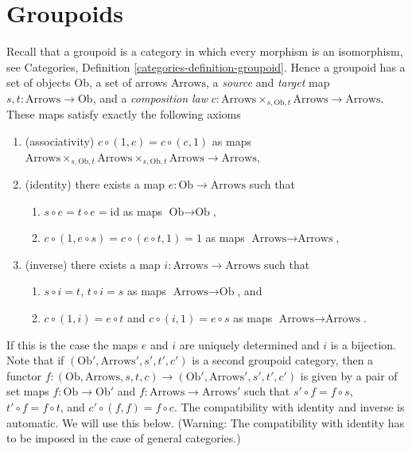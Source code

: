 \section{Groupoids}
\label{groupoids-section-groupoids}
Recall that a groupoid is a category in which every morphism
is an isomorphism, see
Categories, Definition \ref{categories-definition-groupoid}.
Hence a groupoid has a set of objects $\text{Ob}$,
a set of arrows $\text{Arrows}$, a {\it source} and {\it target}
map $s, t : \text{Arrows} \to \text{Ob}$, and a {\it composition law}
$c : \text{Arrows} \times_{s, \text{Ob}, t} \text{Arrows}
\to \text{Arrows}$.
These maps satisfy exactly the following axioms
\begin{enumerate}
\item (associativity) $c \circ (1, c) = c \circ (c, 1)$ as maps
$\text{Arrows} \times_{s, \text{Ob}, t}
\text{Arrows} \times_{s, \text{Ob}, t}
\text{Arrows} \to \text{Arrows}$,
\item (identity) there exists a map $e : \text{Ob} \to \text{Arrows}$
such that
\begin{enumerate}
\item $s \circ e = t \circ e = \text{id}$ as maps $\text{Ob} \to \text{Ob}$,
\item $c \circ (1, e \circ s) = c \circ (e \circ t, 1) = 1$
as maps $\text{Arrows} \to \text{Arrows}$,
\end{enumerate}
\item (inverse) there exists a map $i : \text{Arrows} \to \text{Arrows}$
such that
\begin{enumerate}
\item $s \circ i = t$, $t \circ i = s$ as maps $\text{Arrows} \to \text{Ob}$,
and
\item $c \circ (1, i) = e \circ t$ and $c \circ (i, 1) = e \circ s$
as maps $\text{Arrows} \to \text{Arrows}$.
\end{enumerate}
\end{enumerate}
If this is the case the maps $e$ and $i$ are uniquely determined and
$i$ is a bijection. Note that if $(\text{Ob}', \text{Arrows}', s', t', c')$
is a second groupoid category, then a functor
$f : (\text{Ob}, \text{Arrows}, s, t, c) \to
(\text{Ob}', \text{Arrows}', s', t', c')$
is given by a pair of set maps $f : \text{Ob} \to \text{Ob}'$ and
$f : \text{Arrows} \to \text{Arrows}'$ such that
$s' \circ f = f \circ s$, $t' \circ f = f \circ t$, and
$c' \circ (f, f) = f \circ c$. The compatibility with identity and
inverse is automatic. We will use this below.
(Warning: The compatibility with identity
has to be imposed in the case of general categories.)

